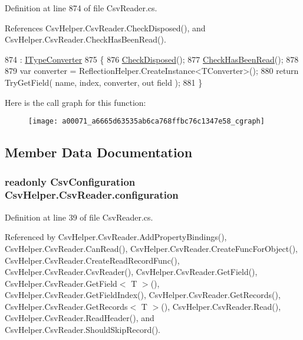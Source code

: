 Definition at line 874 of file Csv\-Reader.\-cs.



References Csv\-Helper.\-Csv\-Reader.\-Check\-Disposed(), and Csv\-Helper.\-Csv\-Reader.\-Check\-Has\-Been\-Read().


\begin{DoxyCode}
874                                                                                                            
          : \hyperlink{a00117}{ITypeConverter}
875         \{
876             \hyperlink{a00071_a6fa45a46ed1322dc1872ca2321b5edbc}{CheckDisposed}();
877             \hyperlink{a00071_a2d9249171ed1568e45d152766d364c31}{CheckHasBeenRead}();
878 
879             var converter = ReflectionHelper.CreateInstance<TConverter>();
880             \textcolor{keywordflow}{return} TryGetField( name, index, converter, out field );
881         \}
\end{DoxyCode}


Here is the call graph for this function\-:
\nopagebreak
\begin{figure}[H]
\begin{center}
\leavevmode
\texttt{[image: a00071\_a6665d63535ab6ca768ffbc76c1347e58\_cgraph]}
\end{center}
\end{figure}




\subsection{Member Data Documentation}
\hypertarget{a00071_a695622911e45cbac8d67dcbd9a3e2967}{
\subsubsection[{configuration}]{\setlength{\rightskip}{0pt plus 5cm}readonly {\bf Csv\-Configuration} Csv\-Helper.\-Csv\-Reader.\-configuration\hspace{0.3cm}{\ttfamily [private]}}}\label{a00071_a695622911e45cbac8d67dcbd9a3e2967}


Definition at line 39 of file Csv\-Reader.\-cs.



Referenced by Csv\-Helper.\-Csv\-Reader.\-Add\-Property\-Bindings(), Csv\-Helper.\-Csv\-Reader.\-Can\-Read(), Csv\-Helper.\-Csv\-Reader.\-Create\-Func\-For\-Object(), Csv\-Helper.\-Csv\-Reader.\-Create\-Read\-Record\-Func(), Csv\-Helper.\-Csv\-Reader.\-Csv\-Reader(), Csv\-Helper.\-Csv\-Reader.\-Get\-Field(), Csv\-Helper.\-Csv\-Reader.\-Get\-Field$<$ T $>$(), Csv\-Helper.\-Csv\-Reader.\-Get\-Field\-Index(), Csv\-Helper.\-Csv\-Reader.\-Get\-Records(), Csv\-Helper.\-Csv\-Reader.\-Get\-Records$<$ T $>$(), Csv\-Helper.\-Csv\-Reader.\-Read(), Csv\-Helper.\-Csv\-Reader.\-Read\-Header(), and Csv\-Helper.\-Csv\-Reader.\-Should\-Skip\-Record().

